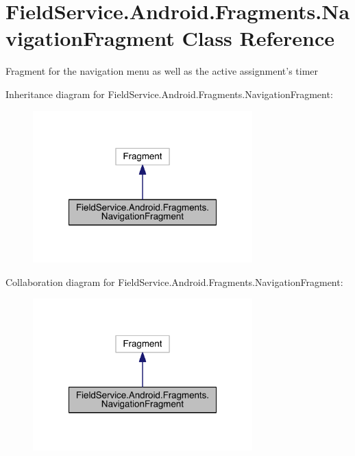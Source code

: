 \hypertarget{class_field_service_1_1_android_1_1_fragments_1_1_navigation_fragment}{\section{Field\+Service.\+Android.\+Fragments.\+Navigation\+Fragment Class Reference}
\label{class_field_service_1_1_android_1_1_fragments_1_1_navigation_fragment}
}


Fragment for the navigation menu as well as the active assignment's timer  




Inheritance diagram for Field\+Service.\+Android.\+Fragments.\+Navigation\+Fragment\+:
\nopagebreak
\begin{figure}[H]
\begin{center}
\leavevmode
\includegraphics[width=240pt]{class_field_service_1_1_android_1_1_fragments_1_1_navigation_fragment__inherit__graph}
\end{center}
\end{figure}


Collaboration diagram for Field\+Service.\+Android.\+Fragments.\+Navigation\+Fragment\+:
\nopagebreak
\begin{figure}[H]
\begin{center}
\leavevmode
\includegraphics[width=240pt]{class_field_service_1_1_android_1_1_fragments_1_1_navigation_fragment__coll__graph}
\end{center}
\end{figure}
